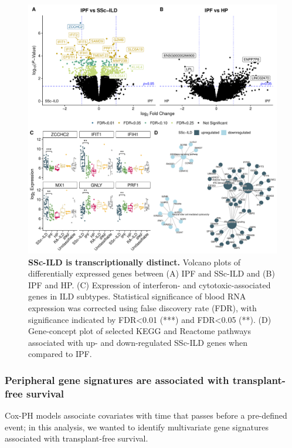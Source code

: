 \documentclass[
]{article}
\begin{document}
\begin{figure}

{\centering \includegraphics[width=0.9\linewidth,]{./Figures/BloodRNAseq/Fig1_Differential_Expression_v1} 

}

\caption[SSc-ILD transcriptome]{\textbf{SSc-ILD is transcriptionally distinct.} Volcano plots of differentially expressed genes between (A) IPF and SSc-ILD and (B) IPF and HP. (C) Expression of interferon- and cytotoxic-associated genes in ILD subtypes. Statistical significance of blood RNA expression was corrected using false discovery rate (FDR), with significance indicated by FDR\textless0.01 (***) and FDR\textless0.05 (**). (D) Gene-concept plot of selected KEGG and Reactome pathways associated with up- and down-regulated SSc-ILD genes when compared to IPF.}\label{fig:degild}
\end{figure}

\subsubsection{Peripheral gene signatures are associated with transplant-free survival}\label{peripheral-gene-signatures-are-associated-with-transplant-free-survival}

Cox-PH models associate covariates with time that passes before a pre-defined event; in this analysis, we wanted to identify multivariate gene signatures associated with transplant-free survival.
\end{document}
